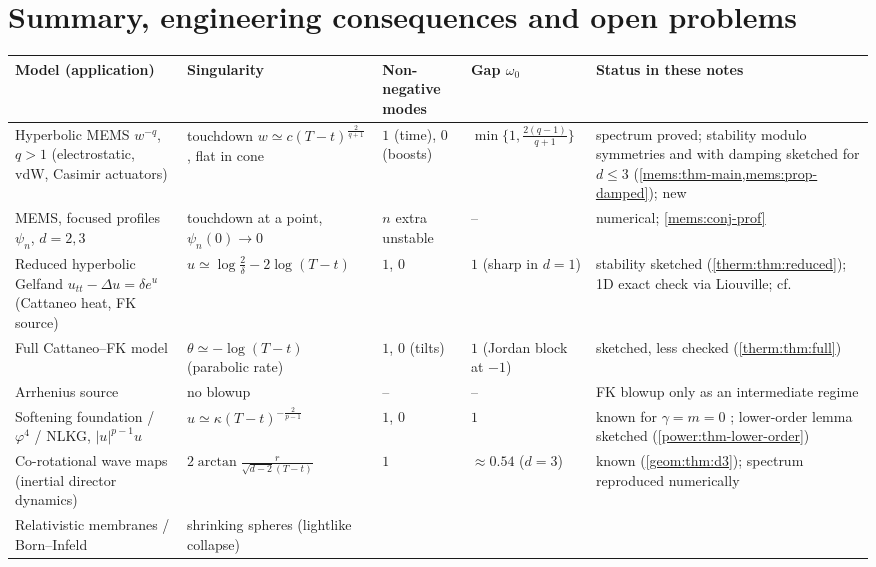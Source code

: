 \section{Summary, engineering consequences and open problems}
\label{concl:sec}

\begin{table}[ht]
\centering\footnotesize
\renewcommand{\arraystretch}{1.25}
\begin{tabularx}{\textwidth}{@{}>{\raggedright\arraybackslash}p{}>{\raggedright\arraybackslash}p{}>{\raggedright\arraybackslash}p{}>{\raggedright\arraybackslash}p{}>{\raggedright\arraybackslash}X@{}}
\toprule
Model (application) & Singularity & Non-negative modes & Gap $\omega_0$ & Status in these notes\\
\midrule
Hyperbolic MEMS $w^{-q}$, $q>1$ (electrostatic, vdW, Casimir actuators)
 & touchdown $w\simeq c(T-t)^{\frac2{q+1}}$, flat in cone
 & $1$ (time), $0$ (boosts)
 & $\min\{1,\frac{2(q-1)}{q+1}\}$
 & spectrum proved; stability modulo symmetries and with damping sketched
   for $d\le3$ (\cref{mems:thm-main,mems:prop-damped}); new\\
MEMS, focused profiles $\psi_n$, $d=2,3$
 & touchdown at a point, $\psi_n(0)\to0$
 & $n$ extra unstable
 & --
 & numerical; \cref{mems:conj-prof}\\
Reduced hyperbolic Gelfand $u_{tt}-\Delta u=\delta e^u$ (Cattaneo heat, FK source)
 & $u\simeq\log\frac2\delta-2\log(T-t)$
 & $1$, $0$
 & $1$ (sharp in $d=1$)
 & stability sketched (\cref{therm:thm:reduced}); 1D exact check via Liouville;
   cf.\ \cite{Kichenassamy1996}\\
Full Cattaneo--FK model
 & $\theta\simeq-\log(T-t)$ (parabolic rate)
 & $1$, $0$ (tilts)
 & $1$ (Jordan block at $-1$)
 & sketched, less checked (\cref{therm:thm:full})\\
Arrhenius source
 & no blowup
 & --
 & --
 & FK blowup only as an intermediate regime\\
Softening foundation / $\varphi^4$ / NLKG, $|u|^{p-1}u$
 & $u\simeq\kappa(T-t)^{-\frac2{p-1}}$
 & $1$, $0$
 & $1$
 & known for $\gamma=m=0$ \cite{Ostermann2024}; lower-order lemma sketched
   (\cref{power:thm-lower-order})\\
Co-rotational wave maps (inertial director dynamics)
 & $2\arctan\frac{r}{\sqrt{d-2}(T-t)}$
 & $1$
 & $\approx0.54$ ($d=3$)
 & known (\cref{geom:thm:d3}); spectrum reproduced numerically\\
Relativistic membranes / Born--Infeld
 & shrinking spheres (lightlike collapse)

\end{tabularx}
\end{table}
